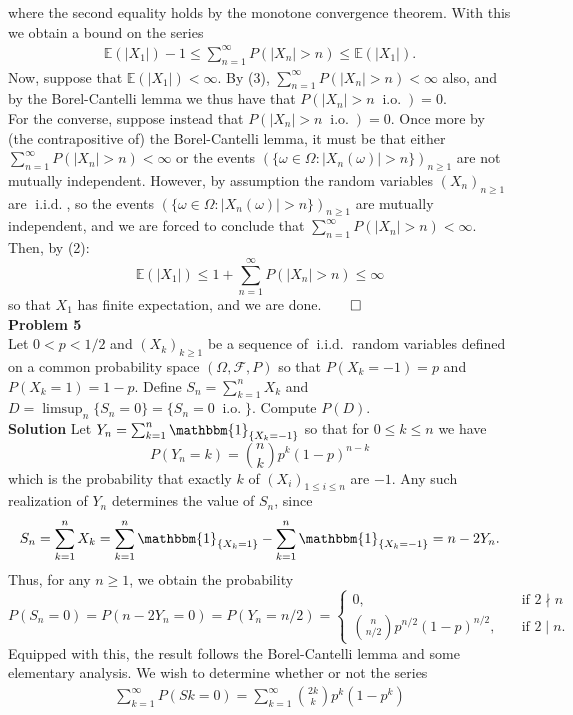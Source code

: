 \documentclass[10pt]{article}
\newcommand{\E}{\mathbb{E}}
\newcommand{\1}[1]{\mathbbm{1}_{#1}}
\newcommand{\mc}[1]{\mathcal{#1}}
\newcommand{\nck}[2]{{#1\choose#2}}
\DeclareMathOperator{\io}{i.o.}
\DeclareMathOperator{\iid}{i.i.d.}
\begin{document}
    where the second equality holds by the monotone convergence theorem. With this we obtain a bound on the series
    \begin{align*}
        \E(|X_1|)-1\leq \sum_{n=1}^\infty P(|X_n|>n) \leq \E(|X_1|).\tag{2}
    \end{align*}
    Now, suppose that $\E(|X_1|)<\infty$. By (3), $\sum_{n=1}^\infty P(|X_n|>n)<\infty$ also, and by the Borel-Cantelli lemma we thus have that $P(|X_n|>n\;\io)=0$. \\[5pt]
    For the converse, suppose instead that $P(|X_n|>n\;\io)=0$. Once more by (the contrapositive of) the Borel-Cantelli lemma, it must be that either $\sum_{n=1}^\infty P(|X_n|>n)<\infty$ or the events $(\{\omega\in\Omega:|X_n(\omega)|>n\})_{n\geq 1}$ are not mutually independent.
    However, by assumption the random variables $(X_n)_{n\geq 1}$ are $\iid$, so the events $(\{\omega\in\Omega:|X_n(\omega)|>n\})_{n\geq 1}$ are mutually independent, and we are forced to conclude that $\sum_{n=1}^\infty P(|X_n|>n)<\infty$. Then, by (2):
    \[\E(|X_1|)\leq 1+\sum_{n=1}^\infty P(|X_n|>n)\leq \infty\]
    so that $X_1$ has finite expectation, and we are done.\hfill{$\qed$}\\[5pt]
    {\bf Problem 5}\\[5pt]
    Let $0<p<1/2$  and $(X_k)_{k\geq 1}$ be a sequence of $\iid$ random variables defined on a common probability space $(\Omega,\mc{F},P)$ so that $P(X_k=-1)=p$ and $P(X_k=1)=1-p$. Define $S_n=\sum_{k=1}^nX_k$ and $D=\limsup_n\{S_n=0\}=\{S_n=0\;\io\}$. Compute $P(D)$.\\[5pt]
    {\bf Solution}\hspace{5pt}
    Let $Y_n=\sum_{k=1}^n\1{\{X_k=-1\}}$ so that for $0\leq k\leq n$ we have
    \[P(Y_n=k)=\nck{n}{k}p^k(1-p)^{n-k}\]
    which is the probability that exactly $k$ of $(X_i)_{1\leq i\leq n}$ are $-1$. Any such realization of $Y_n$ determines the value of $S_n$, since
    \[S_n=\sum_{k=1}^n X_k=\sum_{k=1}^n\1{\{X_k=1\}}-\sum_{k=1}^n\1{\{X_k=-1\}}=n-2Y_n.\]
    Thus, for any $n\geq 1$, we obtain the probability
    \[P(S_n=0)=P(n-2Y_n=0)=P(Y_n=n/2)=\begin{cases}
        0,\quad&\text{if $2\nmid n$}\\
        \nck{n}{n/2}p^{n/2}(1-p)^{n/2},\quad&\text{if $2\mid n$}.
    \end{cases}\]
    Equipped with this, the result follows the Borel-Cantelli lemma and some elementary analysis. We wish to determine whether or not the series
    \begin{align*}
        \sum_{k=1}^\infty P(Sk=0)=\sum_{k=1}^\infty\nck{2k}{k}p^k(1-p^k)
    \end{align*}
\end{document}
